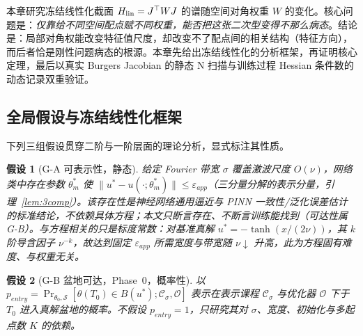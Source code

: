 \documentclass[fontset=windows,11pt]{ctexart}
\newcommand{\W}{W}
\newtheorem{assumption}{假设}[section]
\numberwithin{equation}{section}
\begin{document}
本章研究冻结线性化截面 $H_{\rm lin}=J^\top\W J$ 的谱随空间对角权重 $\W$ 的变化。核心问题是：\emph{仅靠给不同空间配点赋不同权重，能否把这张二次型变得不那么病态}。结论是：局部对角权能改变特征值尺度，却改变不了配点间的相关结构（特征方向），而后者恰是刚性问题病态的根源。本章先给出冻结线性化的分析框架，再证明核心定理，最后以真实 Burgers Jacobian 的静态 N 扫描与训练过程 Hessian 条件数的动态记录双重验证。

\subsection{全局假设与冻结线性化框架}\label{sec:R-frame}

下列三组假设贯穿二阶与一阶层面的理论分析，显式标注其性质。

\begin{assumption}[G-A 可表示性，静态]\label{ass:GA}
给定 Fourier 带宽 $\sigma$ 覆盖激波尺度 $O(\nu)$，网络类中\emph{存在}参数 $\theta_m^*$ 使 $\|u^*-u(\cdot;\theta_m^*)\|\le\varepsilon_{app}$（三分量分解的表示分量，引理~\ref{lem:3comp}）。该\emph{存在性}是神经网络通用逼近与 PINN 一致性/泛化误差估计的标准结论\cite{Shin2020,MishraMolinaro2020,DeRyckMishra2024}，\emph{不依赖具体方程}；本文只断言存在、不断言训练能找到（可达性属 G-B）。\emph{与方程相关的只是标度常数}：对基准真解 $u^*=-\tanh(x/(2\nu))$，其 $k$ 阶导含因子 $\nu^{-k}$，故达到固定 $\varepsilon_{app}$ 所需宽度与带宽随 $\nu\downarrow$ 升高，此为方程固有难度、与权重无关。
\end{assumption}

\begin{assumption}[G-B 盆地可达，Phase~0，概率性]\label{ass:GB}
以 $p_{entry}=\Pr_{\theta_0,\mathcal S}[\theta(T_0)\in B(u^*);\mathcal C_\sigma,\mathcal O]$ 表示在表示课程 $\mathcal C_\sigma$ 与优化器 $\mathcal O$ 下于 $T_0$ 进入真解盆地的概率。不假设 $p_{entry}=1$，只研究其对 $\sigma$、宽度、初始化与多起点数 $K$ 的依赖。
\end{assumption}
\end{document}
